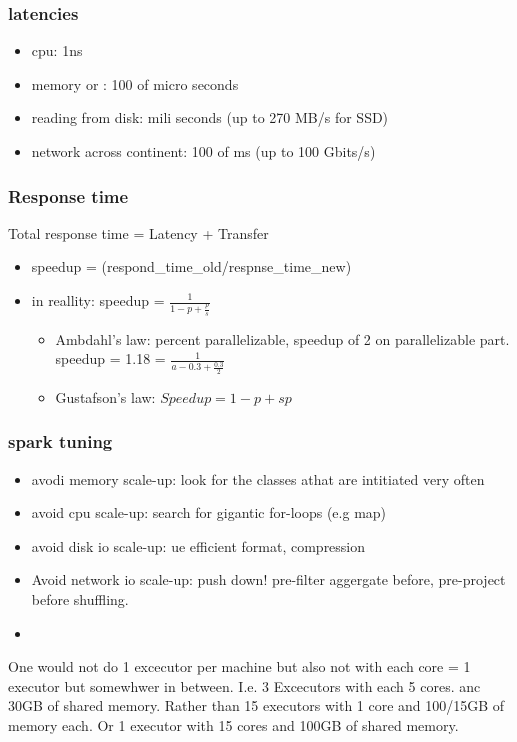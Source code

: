 \subsubsection{latencies}
\begin{itemize}
    \item cpu: 1ns
    \item memory or : 100 of micro seconds
    \item reading from disk: mili seconds (up to 270 MB/s for SSD)
    \item network across continent: 100 of ms (up to 100 Gbits/s)
\end{itemize}


\subsubsection{Response time}
Total response time = Latency + Transfer

\begin{itemize}
    \item speedup = (respond_time_old/respnse_time_new)
    \item in reallity: speedup = $\frac{1}{1-p+\frac{p}{s}}$
    \begin{itemize}
        \item Ambdahl's law: percent parallelizable, speedup of 2 on parallelizable part. \textrightarrow speedup = 1.18 = $\frac{1}{a-0.3+\frac{0.3}{2}}$
        \item Gustafson's law: $Speedup= 1-p+sp$
    \end{itemize}
\end{itemize}


\subsubsection{spark tuning}
\begin{itemize}
    \item avodi memory scale-up: look for the classes athat are intitiated very often
    \item avoid cpu scale-up: search for gigantic for-loops (e.g map)
    \item avoid disk io scale-up: ue efficient format, compression
    \item Avoid network io scale-up: push down! pre-filter aggergate before, pre-project before shuffling.
    \item
\end{itemize}

One would not do 1 excecutor per machine but also not with each core = 1 executor but somewhwer in between.
I.e. 3 Excecutors with each 5 cores. anc 30GB of shared memory.
Rather than 15 executors with 1 core and 100/15GB of memory each.
Or 1 executor with 15 cores and 100GB of shared memory.

